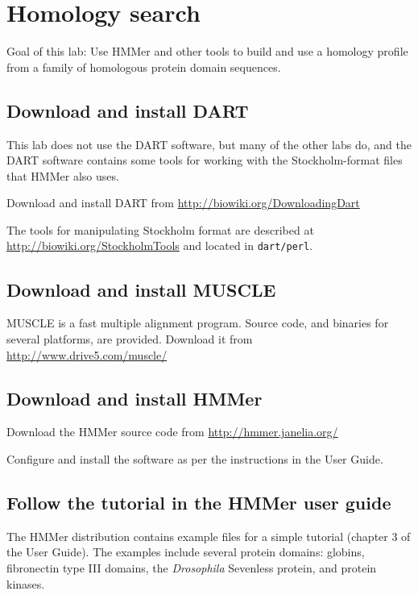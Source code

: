 \chapter{Homology search}

Goal of this lab:
Use HMMer \cite{FinnClementsEddy2011} and other tools to build and use a homology profile from a family of homologous protein domain sequences.

\section{Download and install DART}

This lab does not use the DART software, but many of the other labs do,
and the DART software contains some tools for working with the Stockholm-format files that HMMer also uses.

Download and install DART from \url{http://biowiki.org/DownloadingDart}

The tools for manipulating Stockholm format are described at \url{http://biowiki.org/StockholmTools}
and located in {\tt dart/perl}.

\section{Download and install MUSCLE}

MUSCLE \cite{Edgar2004b} is a fast multiple alignment program.
Source code, and binaries for several platforms, are provided.
Download it from \url{http://www.drive5.com/muscle/}

\section{Download and install HMMer}

Download the HMMer source code from \url{http://hmmer.janelia.org/}

Configure and install the software as per the instructions in the User Guide.

\section{Follow the tutorial in the HMMer user guide}

The HMMer distribution contains example files for a simple tutorial (chapter 3 of the User Guide).
The examples include several protein domains: globins, fibronectin type III domains, the {\em Drosophila} Sevenless protein, and protein kinases.

